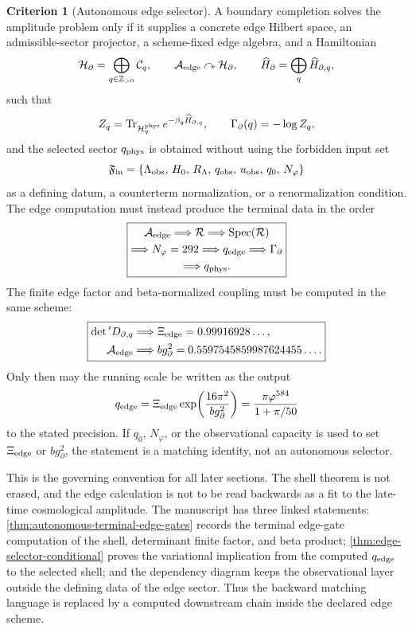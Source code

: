 \documentclass[aps,prd,reprint,nofootinbib,superscriptaddress,floatfix]{revtex4-2}
\numberwithin{equation}{section}
\theoremstyle{definition}
\newtheorem{criterion}{Criterion}[section]
\theoremstyle{plain}
\begin{document}
\begin{criterion}[Autonomous edge selector]\label{crit:autonomous-edge-selector}
A boundary completion solves the amplitude problem only if it supplies a concrete
edge Hilbert space, an admissible-sector projector, a scheme-fixed edge algebra,
and a Hamiltonian
\[
\mathcal H_\partial=\bigoplus_{q\in\mathbb Z_{>0}}\mathcal C_q,
\qquad
\mathcal A_{\rm edge}\curvearrowright\mathcal H_\partial,
\qquad
\widehat H_\partial=\bigoplus_q\widehat H_{\partial,q},
\]
such that
\[
Z_q=\operatorname{Tr}_{\mathcal H_q^{\rm phys}}
e^{-\beta_q\widehat H_{\partial,q}},
\qquad
\Gamma_\partial(q)=-\log Z_q,
\]
and the selected sector \(q_{\rm phys}\) is obtained without using the forbidden
input set
\[
\mathfrak F_{\rm in}
=
\{\Lambda_{\rm obs},\,H_0,\,R_\Lambda,\,q_{\rm obs},\,u_{\rm obs},\,q_0,\,
N_\varphi\}
\]
as a defining datum, a counterterm normalization, or a renormalization
condition.  The edge computation must instead produce the terminal data in the
order
\[
\boxed{
\begin{gathered}
\mathcal A_{\rm edge}\Longrightarrow\mathcal R
\Longrightarrow\operatorname{Spec}(\mathcal R)\\
\Longrightarrow N_\varphi=292
\Longrightarrow q_{\rm edge}
\Longrightarrow\Gamma_\partial\\
\Longrightarrow q_{\rm phys}.
\end{gathered}
}
\]
The finite edge factor and beta-normalized coupling must be computed in the
same scheme:
\[
\boxed{
\begin{aligned}
\det{}'D_{\partial,q}
&\Longrightarrow \Xi_{\rm edge}=0.99916928\ldots,\\
\mathcal A_{\rm edge}
&\Longrightarrow b g_\partial^2
=0.5597545859987624455\ldots .
\end{aligned}
}
\]
Only then may the running scale be written as the output
\[
q_{\rm edge}
=
\Xi_{\rm edge}\exp\!\left(\frac{16\pi^2}{b g_\partial^2}\right)
=
\frac{\pi\varphi^{584}}{1+\pi/50}
\]
to the stated precision.  If \(q_0\), \(N_\varphi\), or the observational
capacity is used to set \(\Xi_{\rm edge}\) or \(b g_\partial^2\), the statement
is a matching identity, not an autonomous selector.
\end{criterion}

This is the governing convention for all later sections.  The shell theorem is
not erased, and the edge calculation is not to be read backwards as a fit to the
late-time cosmological amplitude.  The manuscript has
three linked statements: \cref{thm:autonomous-terminal-edge-gates} records the
terminal edge-gate computation of the shell, determinant finite factor, and beta
product; \cref{thm:edge-selector-conditional} proves the variational implication
from the computed \(q_{\rm edge}\) to the selected shell; and the dependency
diagram keeps the observational layer outside the defining data of the edge
sector.  Thus the backward matching language is replaced by a computed downstream
chain inside the declared edge scheme.
\end{document}
